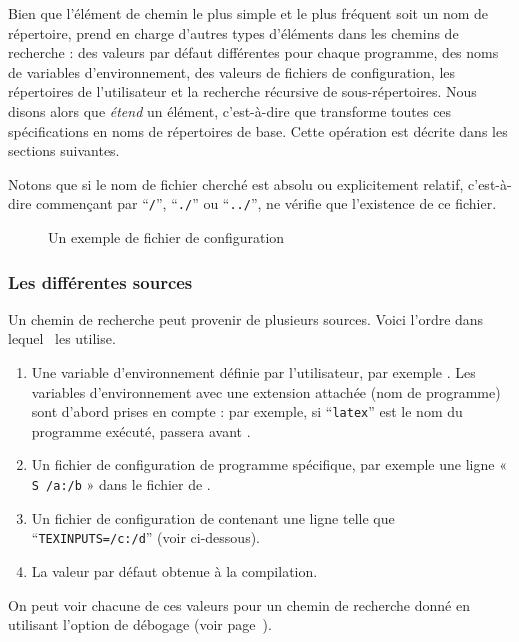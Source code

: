 \documentclass[german, english, french]{article}
\renewcommand{\samp}[1]{\enquote{\texttt{#1}}}
\begin{document}
Bien que l'élément de chemin le plus simple et le plus fréquent soit un nom de
répertoire, \KPS{} prend en charge d'autres types d'éléments dans les chemins de
recherche : des valeurs par défaut différentes pour chaque programme, des noms
de variables d'environnement, des valeurs de fichiers de configuration, les
répertoires de l'utilisateur et la recherche récursive de sous-répertoires. Nous
disons alors que \KPS{} \emph{étend} un élément, c'est-à-dire que \KPS{}
transforme toutes ces spécifications en noms de répertoires de base. Cette
opération est décrite dans les sections suivantes.

Notons que si le nom de fichier cherché est absolu ou explicitement relatif,
c'est-à-dire commençant par \samp{/}, \samp{./} ou \samp{../}, \KPS{} ne vérifie
que l'existence de ce fichier.  \ifSingleColumn \else
\begin{figure*}
  \centering  \setlength{\abovecaptionskip}{0pt}
  \caption{Un exemple de fichier de configuration}
  \label{fig:config-sample}
\end{figure*}
\fi

\subsubsection{Les différentes sources}
\label{sec:path-sources}

Un chemin de recherche peut provenir de plusieurs sources. Voici l'ordre dans
lequel \KPS\ les utilise.

\begin{enumerate}
\item Une variable d'environnement définie par l'utilisateur, par exemple
  . Les variables d'environnement avec une extension attachée
  (nom de programme) sont d'abord prises en compte : par exemple, si
  \samp{latex} est le nom du programme exécuté, 
  passera avant .
\item Un fichier de configuration de programme spécifique, par exemple une ligne
  « \texttt{S /a:/b} » dans le fichier  de .
\item Un fichier de configuration  de \KPS{} contenant une ligne
  telle que \\ \samp{TEXINPUTS=/c:/d} (voir ci-dessous).
\item La valeur par défaut obtenue à la compilation.
\end{enumerate}
\noindent On peut voir chacune de ces valeurs pour un chemin de recherche donné
en utilisant l'option de débogage (voir page~\pageref{sec:debugging}).
\end{document}

